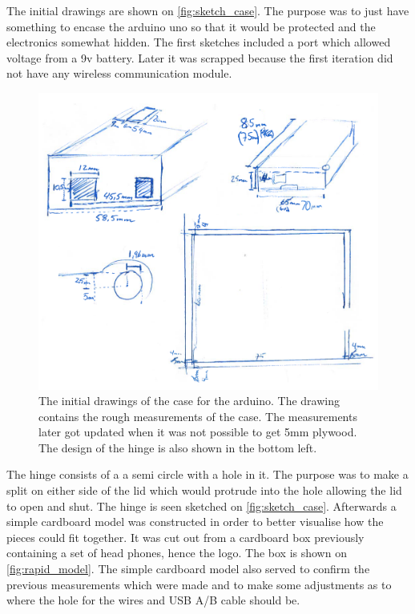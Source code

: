 \noindent
The initial drawings are shown on \autoref{fig:sketch_case}. The purpose was to just have something to encase the arduino uno so that it would be protected and the electronics somewhat hidden. The first sketches included a port which allowed voltage from a 9v battery. Later it was scrapped because the first iteration did not have any wireless communication module.
\begin{figure}[H]
\centering
\includegraphics[scale = 0.5]{Figure/sketch_case.png}
\caption{The initial drawings of the case for the arduino. The drawing contains the rough measurements of the case. The measurements later got updated when it was not possible to get 5mm plywood. The design of the hinge is also shown in the bottom left.}
\label{fig:sketch_case}
\end{figure}

The hinge consists of a a semi circle with a hole in it. The purpose was to make a split on either side of the lid which would protrude into the hole allowing the lid to open and shut. The hinge is seen sketched on \autoref{fig:sketch_case}. 
\noindent
Afterwards a simple cardboard model was constructed in order to better visualise how the pieces could fit together. It was cut out from a cardboard box previously containing a set of head phones, hence the logo. The box is shown on \autoref{fig:rapid_model}. The simple cardboard model also served to confirm the previous measurements which were made and to make some adjustments as to where the hole for the wires and USB A/B cable should be.


